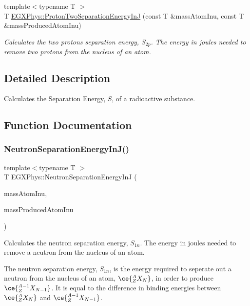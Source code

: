 \begin{DoxyCompactItemize}
{\footnotesize template$<$typename T $>$ }\\T \hyperlink{group___e_g_x_phys-_nuclear_separation_energy_gad7c1d4a32daa8aaa53c5fce37c421f82}{E\+G\+X\+Phys\+::\+Proton\+Two\+Separation\+Energy\+InJ} (const T \&mass\+Atom\+Inu, const T \&mass\+Produced\+Atom\+Inu)
\begin{DoxyCompactList}\small\item\em Calculates the two protons separation energy, $S_{2p}$. The energy in joules needed to remove two protons from the nucleus of an atom. \end{DoxyCompactList}\end{DoxyCompactItemize}


\subsection{Detailed Description}
Calculates the Separation Energy, $S$, of a radioactive substance. 

\subsection{Function Documentation}
\mbox{\label{group___e_g_x_phys-_nuclear_separation_energy_ga14a4bb972ae000ef4ff35f2734ff22d0}} 
\subsubsection{\texorpdfstring{Neutron\+Separation\+Energy\+In\+J()}{NeutronSeparationEnergyInJ()}}
{\footnotesize\ttfamily template$<$typename T $>$ \\
T E\+G\+X\+Phys\+::\+Neutron\+Separation\+Energy\+InJ (\begin{DoxyParamCaption}\item[{const T \&}]{mass\+Atom\+Inu,  }\item[{const T \&}]{mass\+Produced\+Atom\+Inu }\end{DoxyParamCaption})}



Calculates the neutron separation energy, $S_{1n}$. The energy in joules needed to remove a neutron from the nucleus of an atom. 

The neutron separation energy, $S_{1n}$, is the energy required to seperate out a neutron from the nucleus of an atom, $\ce{ ^{A}_{Z}X_{N} }$, in order to produce $\ce{ ^{A-1}_{Z}X_{N-1} }$. It is equal to the difference in binding energies between $\ce{ ^{A}_{Z}X_{N} }$ and $\ce{ ^{A-1}_{Z}X_{N-1} }$.


